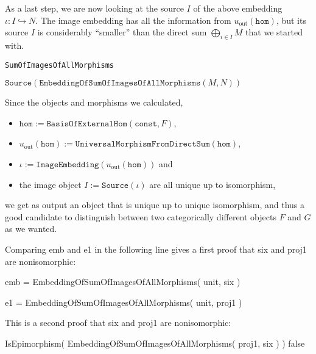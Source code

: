 As a last step, we are now looking at the source $I$ of the above embedding $\iota : I \hookrightarrow N$. The image
embedding has all the information from $u_{\text{out}}(\mathtt{hom})$, but its source $I$ is considerably ``smaller'' than the
direct sum $\bigoplus_{i\in I} M$ that we started with. 

\begin{algorithm}[H]\capstart
    \caption{\texttt{SumOfImagesOfAllMorphisms}}\label{algo:SumOfImagesOfAllMorphisms}
	\BlankLine
	\Return $\mathtt{Source}( \mathtt{EmbeddingOfSumOfImagesOfAllMorphisms}( M, N ) )$\;
\end{algorithm}

Since the objects and morphisms we calculated,
\begin{itemize}
\item $\mathtt{hom} := \mathtt{BasisOfExternalHom}(\mathtt{const},F)$,
\item $u_{\text{out}}(\mathtt{hom}) := \mathtt{UniversalMorphismFromDirectSum}(\mathtt{hom})$,
\item $\iota := \mathtt{ImageEmbedding}(u_{\text{out}}(\mathtt{hom}))$ and
\item the image object $I := \mathtt{Source}(\iota)$ are all unique up to isomorphism,
\end{itemize}
we get as output an object that is unique up to unique isomorphism, and thus a good candidate to distinguish
between two categorically different objects $F$ and $G$ as we wanted.

\begin{example}
Comparing emb and e1 in the following line gives a first proof that six and proj1 are nonisomorphic:

emb = EmbeddingOfSumOfImagesOfAllMorphisms( unit, six )

e1 = EmbeddingOfSumOfImagesOfAllMorphisms( unit, proj1 )

This is a second proof that six and proj1 are nonisomorphic:

IsEpimorphism( EmbeddingOfSumOfImagesOfAllMorphisms( proj1, six ) )
false
\end{example}
